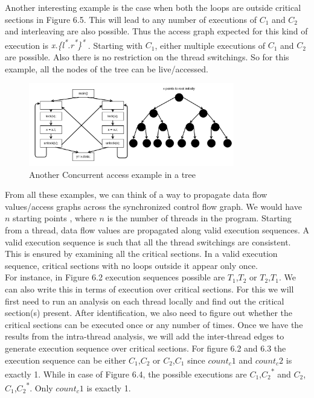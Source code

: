 Another interesting example is the case when both the loops are outside critical sections in Figure 6.5. This will lead to any number of executions of $C_1$ and $C_2$ and interleaving are also possible. Thus the access graph expected for this kind of execution is \emph{x.\{l\textsuperscript{*}.r\textsuperscript{*}\}\textsuperscript{*}} . Starting with $C_1$, either multiple executions of $C_1$ and $C_2$ are possible. Also there is no restriction on the thread switchings. So for this example, all the nodes of the tree can be live/accessed. \\

\begin{figure}
	\centering
	\includegraphics[width=0.8\textwidth]{Figures/tree4.png}
	\caption{Another Concurrent access example in a tree}
	\label{fig:ch5example}
\end{figure}

From all these examples, we can think of a way to propagate data flow values/access graphs across the synchronized control flow graph. We would have $n$ starting points , where $n$ is the number of threads in the program. Starting from a thread, data flow values are propagated along valid execution sequences. A valid execution sequence is such that all the thread switchings are consistent. This is ensured by examining all the critical sections. In a valid execution sequence, critical sections with no loops outside it appear only once. \\

For instance, in Figure 6.2 execution sequences possible are $T_1$,$T_2$ or $T_2$,$T_1$. We can also write this in terms of execution over critical sections. For this we will first need to run an analysis on each thread locally and find out the critical section(s) present. After identification, we also need to figure out whether the critical sections can be executed once or any number of times. Once we have the results from the intra-thread analysis, we will add the inter-thread edges to generate execution sequence over critical sections. For figure 6.2 and 6.3 the execution sequence can be either $C_1$,$C_2$ or $C_2$,$C_1$ since $count_c1$ and $count_c2$ is exactly 1. While in case of Figure 6.4, the possible executions are $C_1$,$C_2$\textsuperscript{*} and $C_2$,$C_1$,$C_2$\textsuperscript{*}. Only $count_c1$ is exactly 1.  \\


